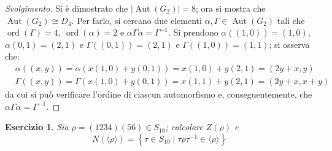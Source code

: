\documentclass[11pt]{article}
\theoremstyle{style}
\newtheorem{esercizio}{Esercizio}[section]
\newenvironment{svolgimento}{\renewcommand\qedsymbol{$\blacksquare$}\begin{proof}[Svolgimento]}{\end{proof}}
\numberwithin{equation}{subsection}
\begin{document}
\begin{svolgimento}
	Si \`e dimostrato che $|\operatorname{Aut} (G_2)| = 8$; ora si mostra che $\operatorname{Aut} (G_2) \cong D_4$.
	Per farlo, si cercano due elementi $\alpha , \Gamma \in \operatorname{Aut} (G_2)$ tali che $\operatorname{ord}(\Gamma) = 4, \ \operatorname{ord}(\alpha ) = 2$ e $\alpha \Gamma \alpha = \Gamma^{-1}$.
	Si prendono $\alpha ((1,0))= (1,0)$, $\alpha (0,1) = (2,1)$ e $\Gamma((0,1)) = (2,1)$ e $\Gamma((1,0)) = (1,1)$; si osserva che:
	\[
	\begin{split}
		&\alpha ((x,y)) = \alpha (x(1,0)+y(0,1)) = x(1,0) + y (2,1) =(2y+x,y)\\
		& \Gamma((x,y)) = \Gamma (x(1,0) + y (0,1)) = x (1,1) + y(2,1) = (2y+x,x+y)
	\end{split}
	\] 
	da cui si pu\`o verificare l'ordine di ciascun automorfismo e, conseguentemente, che $\alpha \Gamma\alpha = \Gamma^{-1}$.
\end{svolgimento}
\begin{esercizio}
Sia $\rho = (1234)(56) \in S_{10}$; calcolare $Z(\rho )$ e 
\[
N(\langle \rho  \rangle)= \left\{ \tau \in S_{10}  \mid \tau \rho \tau ^{-1}\in \langle \rho  \rangle\right\} 
\] 
\end{esercizio}
\end{document}
